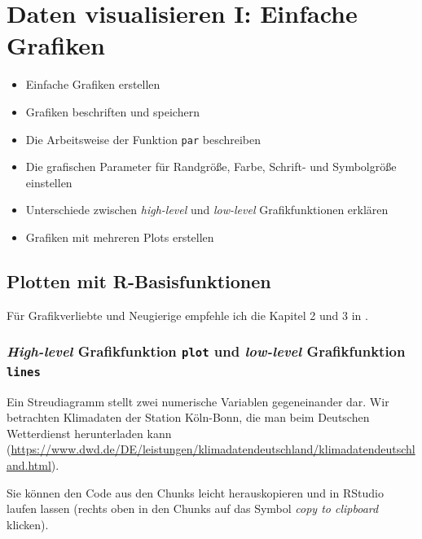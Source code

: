 \documentclass[]{book}
\providecommand{\tightlist}{%
  \setlength{\itemsep}{0pt}\setlength{\parskip}{0pt}}
\newenvironment{rmdoutcomes}{
  \definecolor{outcomes}{rgb}{1.0, 0.92, 0.8}  %
  \color{black}
  \begin{mdframed}[backgroundcolor = outcomes]}
 {\end{mdframed}}
\begin{document}
\hypertarget{visualisieren}{%
\chapter{Daten visualisieren I: Einfache Grafiken}\label{visualisieren}}

\begin{rmdoutcomes}
\begin{itemize}
\tightlist
\item
  Einfache Grafiken erstellen
\item
  Grafiken beschriften und speichern
\item
  Die Arbeitsweise der Funktion \texttt{par} beschreiben
\item
  Die grafischen Parameter für Randgröße, Farbe, Schrift- und
  Symbolgröße einstellen
\item
  Unterschiede zwischen \emph{high-level} und \emph{low-level}
  Grafikfunktionen erklären
\item
  Grafiken mit mehreren Plots erstellen
\end{itemize}
\end{rmdoutcomes}

\hypertarget{plotten-mit-r-basisfunktionen}{%
\section{Plotten mit R-Basisfunktionen}\label{plotten-mit-r-basisfunktionen}}

Für Grafikverliebte und Neugierige empfehle ich die Kapitel 2 und 3 in \citet{Murrell2006}.

\hypertarget{high-level-grafikfunktion-plot-und-low-level-grafikfunktion-lines}{%
\subsection{\texorpdfstring{\emph{High-level} Grafikfunktion \texttt{plot} und \emph{low-level} Grafikfunktion \texttt{lines}}{High-level Grafikfunktion plot und low-level Grafikfunktion lines}}\label{high-level-grafikfunktion-plot-und-low-level-grafikfunktion-lines}}

Ein Streudiagramm stellt zwei numerische Variablen gegeneinander dar. Wir betrachten Klimadaten der Station Köln-Bonn, die man beim Deutschen Wetterdienst herunterladen kann (\url{https://www.dwd.de/DE/leistungen/klimadatendeutschland/klimadatendeutschland.html}).

Sie können den Code aus den Chunks leicht herauskopieren und in RStudio laufen lassen (rechts oben in den Chunks auf das Symbol \emph{copy to clipboard} klicken).
\end{document}
